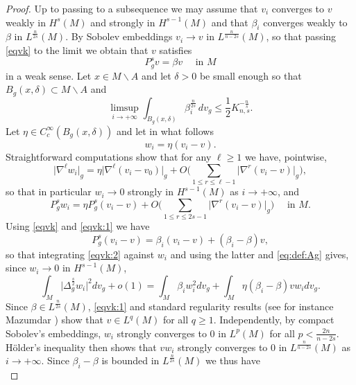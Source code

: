 \documentclass[10pt]{amsart}
\numberwithin{equation}{section}
\def\be{{\beta}}
\def\de{{\delta}}
\theoremstyle{plain}
\theoremstyle{remark}
\begin{document}
\begin{proof}
Up to passing to a subsequence we may assume that $v_i$ converges to $v$ weakly in $H^s(M)$ and strongly in $H^{s-1}(M)$ and that $\beta_i$ converges weakly to $\beta$ in $L^{\frac{n}{2s}}(M)$. By Sobolev embeddings $v_i \to v$ in $L^{\frac{n}{n-2s}}(M)$, so that passing \eqref{eqvk} to the limit we obtain that $v$ satisfies 
\begin{equation} \label{eqvk:1}
P_g^s  v = \be v  \quad \text{ in } M
\end{equation}
in a weak sense. Let $x \in M \backslash A$ and let $\delta >0$ be small enough so that $B_g(x, \de) \subset M \backslash A$ and 
\begin{equation} \label{eq:vk11}
\limsup_{i \to + \infty} \int_{B_g(x,\de)}  \be_i^{\frac{n}{2s}}  \,dv_g \le \frac12 K_{n,s}^{-\frac{n}{s}}. 
\end{equation}
Let $\eta \in C^\infty_c(B_g(x,\de))$ and let in what follows 
$$ w_i = \eta(v_i - v). $$
Straightforward computations show that for any $\ell \ge 1$ we have, pointwise, 
$$\big| \nabla^\ell w_i \big|_g = \eta \big| \nabla^\ell(v_i-v_0) \big|_g + O \big( \sum_{1 \leq r \leq \ell-1} \big| \nabla^r (v_i-v)\big|_g \big),$$
so that in particular $w_i \to 0$ strongly in $H^{s-1}(M)$ as $i \to + \infty$, and 
\begin{equation} \label{eqvk:2}
 P_g^s w_i = \eta P_g^s (v_i - v) + O \big( \sum_{1 \leq r \leq 2s-1} \big| \nabla^r (v_i-v)\big|_g \big) \quad \text{ in } M. 
 \end{equation}
 Using \eqref{eqvk} and \eqref{eqvk:1} we have 
 $$ P_g^s (v_i-v) = \beta_i(v_i-v) + (\beta_i - \beta) v, $$
 so that integrating \eqref{eqvk:2} against $w_i$ and using the latter and \eqref{eq:def:Ag} gives, since $w_i \to 0$ in $H^{s-1}(M)$, 
 \begin{equation} \label{eqvk:3}
  \int_M  \big|\Delta_g^{\frac{s}{2}} w_i \big|^2 dv_g + o(1) = \int_M \beta_i w_i^2 dv_g + \int_M \eta (\beta_i - \beta) v w_i dv_g. 
\end{equation}
Since $\beta \in L^{\frac{n}{2s}}(M)$, \eqref{eqvk:1} and standard regularity results (see for instance Mazumdar \cite[Theorem 5]{Mazumdar1}) show that $v \in L^q(M)$ for all $q \ge 1$. Independently, by compact Sobolev's embeddings, $w_i$ strongly converges to $0$ in $L^p(M)$ for all $p < \frac{2n}{n-2s}$. H\"older's inequality then shows that $v w_i$ strongly converges to $0$ in $L^{\frac{n}{n-2s}}(M)$ as $i \to + \infty$. Since $\beta_{i} - \beta$ is bounded in $L^{\frac{n}{2s}}(M)$ we thus have 
 \begin{equation} \label{eqvk:4}

\end{equation}
\end{proof}
\end{document}
